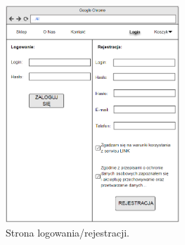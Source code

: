 \documentclass[11pt,a4paper,twoside]{article}
\begin{document}
\begin{figure}[]
\begin{minipage}[b]{0.5\linewidth}
    \vspace{4ex}
  \end{minipage}%
  \begin{minipage}[b]{0.5\linewidth}
  	\caption{Strona logowania/rejestracji.} 
  	\label{login}
    \centering
    \includegraphics[height=8.15cm, width=.75\linewidth]{login} 
    \vspace{4ex}
  \end{minipage} 
\end{figure}
\end{document}
